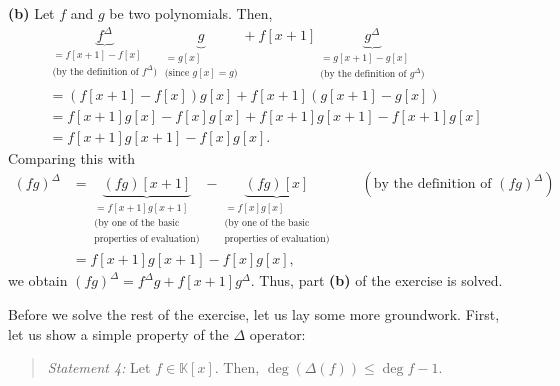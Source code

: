 \documentclass[paper=a4, fontsize=12pt]{scrartcl}%
\theoremstyle{plainsl}
\theoremstyle{definition}
\theoremstyle{remark}
\newenvironment{statement}{\begin{quote}}{\end{quote}}
\begin{document}
\textbf{(b)} Let $f$ and $g$ be two polynomials. Then,%
\begin{align*}
&  \underbrace{f^{\Delta}}_{\substack{=f\left[  x+1\right]  -f\left[
x\right]  \\\text{(by the definition of }f^{\Delta}\text{)}}}\underbrace{g}%
_{\substack{=g\left[  x\right]  \\\text{(since }g\left[  x\right]  =g\text{)}%
}}+f\left[  x+1\right]  \underbrace{g^{\Delta}}_{\substack{=g\left[
x+1\right]  -g\left[  x\right]  \\\text{(by the definition of }g^{\Delta
}\text{)}}}\\
&  =\left(  f\left[  x+1\right]  -f\left[  x\right]  \right)  g\left[
x\right]  +f\left[  x+1\right]  \left(  g\left[  x+1\right]  -g\left[
x\right]  \right) \\
&  =f\left[  x+1\right]  g\left[  x\right]  -f\left[  x\right]  g\left[
x\right]  +f\left[  x+1\right]  g\left[  x+1\right]  -f\left[  x+1\right]
g\left[  x\right] \\
&  =f\left[  x+1\right]  g\left[  x+1\right]  -f\left[  x\right]  g\left[
x\right]  .
\end{align*}
Comparing this with%
\begin{align*}
\left(  fg\right)  ^{\Delta}  &  =\underbrace{\left(  fg\right)  \left[
x+1\right]  }_{\substack{=f\left[  x+1\right]  g\left[  x+1\right]
\\\text{(by one of the basic}\\\text{properties of evaluation)}}%
}-\underbrace{\left(  fg\right)  \left[  x\right]  }_{\substack{=f\left[
x\right]  g\left[  x\right]  \\\text{(by one of the basic}\\\text{properties
of evaluation)}}}\qquad\left(  \text{by the definition of }\left(  fg\right)
^{\Delta}\right) \\
&  =f\left[  x+1\right]  g\left[  x+1\right]  -f\left[  x\right]  g\left[
x\right]  ,
\end{align*}
we obtain $\left(  fg\right)  ^{\Delta}=f^{\Delta}g+f\left[  x+1\right]
g^{\Delta}$. Thus, part \textbf{(b)} of the exercise is solved.

\bigskip

Before we solve the rest of the exercise, let us lay some more groundwork.
First, let us show a simple property of the $\Delta$ operator:

\begin{statement}
\textit{Statement 4:} Let $f\in\mathbb{K}\left[  x\right]  $. Then,
$\deg\left(  \Delta\left(  f\right)  \right)  \leq\deg f-1$.
\end{statement}
\end{document}
